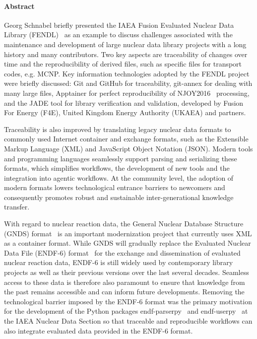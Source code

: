 \paragraph{Abstract}
\mbox{}

Georg Schnabel briefly presented the IAEA Fusion Evaluated Nuclear Data Library (FENDL)~\cite{Schnabel2024FENDL} as an example to discuss challenges associated with the maintenance and development of large nuclear data library projects with a long history and many contributors. Two key aspects are traceability of changes over time and the reproducibility of derived files, such as specific files for transport codes, e.g. MCNP. Key information technologies adopted by the FENDL project were briefly discussed: Git and GitHub for traceability, git-annex for dealing with many large files, Apptainer for perfect reproducibility of NJOY2016~\cite{NJOY} processing, and the JADE tool for library verification and validation, developed by Fusion For Energy (F4E), United Kingdom Energy Authority (UKAEA) and partners.

Traceability is also improved by translating legacy nuclear data formats to commonly used Internet container and exchange formats, such as the Extensible Markup Language (XML) and JavaScript Object Notation (JSON). Modern tools and programming languages seamlessly support parsing and serializing these formats, which simplifies workflows, the development of new tools and the integration into agentic workflows. At the community level, the adoption of modern formats lowers technological entrance barriers to newcomers and consequently promotes robust and sustainable inter-generational knowledge transfer.

With regard to nuclear reaction data, the General Nuclear Database Structure (GNDS) format~\cite{GNDS2023} is an important modernization project that currently uses XML as a container format. While GNDS will gradually replace the Evaluated Nuclear Data File (ENDF-6) format~\cite{ENDF6FormatsManual2023} for the exchange and dissemination of evaluated nuclear reaction data, ENDF-6 is still widely used by contemporary library projects as well as their previous versions over the last several decades. Seamless access to these data is therefore also paramount to ensure that knowledge from the past remains accessible and can inform future developments. Removing the technological barrier imposed by the ENDF-6 format was the primary motivation for the development of the Python packages endf-parserpy~\cite{endf-parserpy} and endf-userpy~\cite{endf-userpy} at the IAEA Nuclear Data Section so that traceable and reproducible workflows can also integrate evaluated data provided in the ENDF-6 format.

